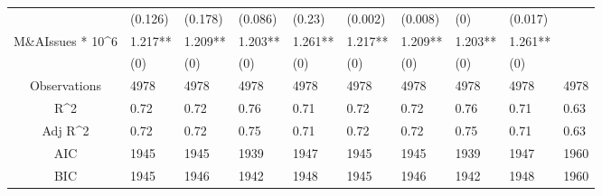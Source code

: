 \documentclass{article}
\begin{document}
\begin{table}[H]
\begin{tabular}{|clllllllll|}
   & (0.126) & (0.178) & (0.086) & (0.23) & (0.002) & (0.008) & (0) & (0.017) &  \\ 
  M\&AIssues * 10^6 & 1.217** & 1.209** & 1.203** & 1.261** & 1.217** & 1.209** & 1.203** & 1.261** &  \\ 
   & (0) & (0) & (0) & (0) & (0) & (0) & (0) & (0) &  \\ 
  \hline 
 Observations & 4978 & 4978 & 4978 & 4978 & 4978 & 4978 & 4978 & 4978 & 4978 \\ 
  R^2 & 0.72 & 0.72 & 0.76 & 0.71 & 0.72 & 0.72 & 0.76 & 0.71 & 0.63 \\ 
  Adj R^2 & 0.72 & 0.72 & 0.75 & 0.71 & 0.72 & 0.72 & 0.75 & 0.71 & 0.63 \\ 
  AIC & 1945 & 1945 & 1939 & 1947 & 1945 & 1945 & 1939 & 1947 & 1960 \\ 
  BIC & 1945 & 1946 & 1942 & 1948 & 1945 & 1946 & 1942 & 1948 & 1960 \\ 
   \hline
\end{tabular}
 
\end{table}
\end{document}
